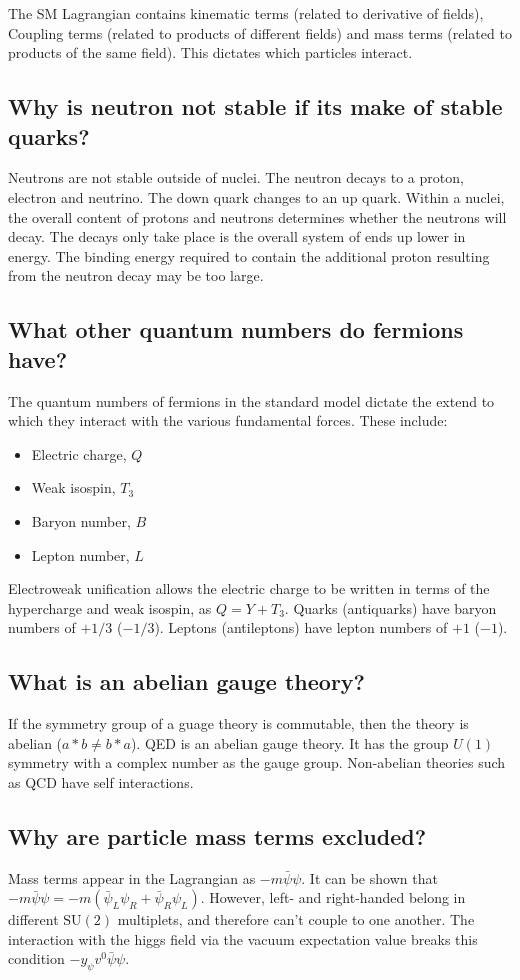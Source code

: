 \documentclass[12pt]{article}
\begin{document}
The SM Lagrangian contains kinematic terms (related to derivative of fields), Coupling terms (related to products of different fields) and mass terms (related to products of the same field). This dictates which particles interact. 

\subsection{Why is neutron not stable if its make of stable quarks?}
Neutrons are not stable outside of nuclei. The neutron decays to a proton, electron and neutrino. The down quark changes to an up quark.
Within a nuclei, the overall content of protons and neutrons determines whether the neutrons will decay. The decays only take place is the overall system of ends up lower in energy. The binding energy required to contain the additional proton resulting from the neutron decay may be too large. 


\subsection{What other quantum numbers do fermions have?}
The quantum numbers of fermions in the standard model dictate the extend to which they interact with the various fundamental forces. These include:
\begin{itemize}
\item Electric charge, $Q$
\item Weak isospin, $T_{3}$
\item Baryon number, $B$
\item Lepton number, $L$
\end{itemize}

Electroweak unification allows the electric charge to be written in terms of the hypercharge and weak isospin, as $Q = Y + T_{3}$. Quarks (antiquarks) have baryon numbers of $+1/3$ ($-1/3$). Leptons (antileptons) have lepton numbers of $+1$ ($-1$).

\subsection{What is an abelian gauge theory?}
If the symmetry group of a guage theory is commutable, then the theory is abelian ($a*b \neq b*a$). QED is an abelian gauge theory. It has the group $U(1)$ symmetry with a complex number as the gauge group. Non-abelian theories such as QCD have self interactions.  


\subsection{Why are particle mass terms excluded?}
Mass terms appear in the Lagrangian as $-m\bar{\psi}\psi$. It can be shown that  $-m\bar{\psi}\psi = -m(\bar{\psi}_{L}\psi_{R} + \bar{\psi}_{R}\psi_{L})$. However, left- and right-handed belong in different $\text{SU}(2)$ multiplets, and therefore can't couple to one another. The interaction with the higgs field via the vacuum expectation value breaks this condition $-y_{\psi}v^{0}\bar{\psi}\psi$.
\end{document}
